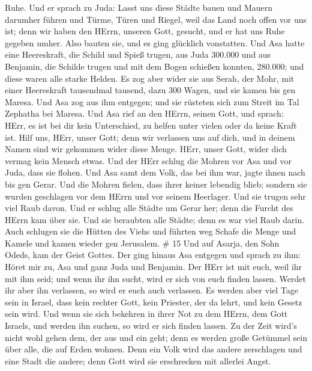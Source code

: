 Ruhe.  Und er sprach zu Juda: Lasst uns diese Städte bauen
und Mauern darumher führen und Türme, Türen und Riegel, weil das Land
noch offen vor uns ist; denn wir haben den HErrn, unseren Gott, gesucht,
und er hat uns Ruhe gegeben umher. Also bauten sie, und es ging
glücklich vonstatten.  Und Asa hatte eine Heereskraft, die
Schild und Spieß trugen, aus Juda 300.000 und aus Benjamin, die Schilde
trugen und mit dem Bogen schießen konnten, 280.000; und diese waren alle
starke Helden.  Es zog aber wider sie aus Serah, der Mohr,
mit einer Heereskraft tausendmal tausend, dazu 300 Wagen, und sie kamen
bis gen Maresa.  Und Asa zog aus ihm entgegen; und sie
rüsteten sich zum Streit im Tal Zephatha bei Maresa.  Und
Asa rief an den HErrn, seinen Gott, und sprach: HErr, es ist bei dir
kein Unterschied, zu helfen unter vielen oder da keine Kraft ist. Hilf
uns, HErr, unser Gott; denn wir verlassen uns auf dich, und in deinem
Namen sind wir gekommen wider diese Menge. HErr, unser Gott, wider dich
vermag kein Mensch etwas.  Und der HErr schlug die Mohren
vor Asa und vor Juda, dass sie flohen.  Und Asa samt dem
Volk, das bei ihm war, jagte ihnen nach bis gen Gerar. Und die Mohren
fielen, dass ihrer keiner lebendig blieb; sondern sie wurden geschlagen
vor dem HErrn und vor seinem Heerlager. Und sie trugen sehr viel Raub
davon.  Und er schlug alle Städte um Gerar her; denn die
Furcht des HErrn kam über sie. Und sie beraubten alle Städte; denn es
war viel Raub darin.  Auch schlugen sie die Hütten des
Viehs und führten weg Schafe die Menge und Kamele und kamen wieder gen
Jerusalem. \# 15  Und auf Asarja, den Sohn Odeds, kam der
Geist Gottes.  Der ging hinaus Asa entgegen und sprach zu
ihm: Höret mir zu, Asa und ganz Juda und Benjamin. Der HErr ist mit
euch, weil ihr mit ihm seid; und wenn ihr ihn sucht, wird er sich von
euch finden lassen. Werdet ihr aber ihn verlassen, so wird er euch auch
verlassen.  Es werden aber viel Tage sein in Israel, dass
kein rechter Gott, kein Priester, der da lehrt, und kein Gesetz sein
wird.  Und wenn sie sich bekehren in ihrer Not zu dem HErrn,
dem Gott Israels, und werden ihn suchen, so wird er sich finden lassen.
 Zu der Zeit wird's nicht wohl gehen dem, der aus und ein
geht; denn es werden große Getümmel sein über alle, die auf Erden
wohnen.  Denn ein Volk wird das andere zerschlagen und eine
Stadt die andere; denn Gott wird sie erschrecken mit allerlei Angst.
